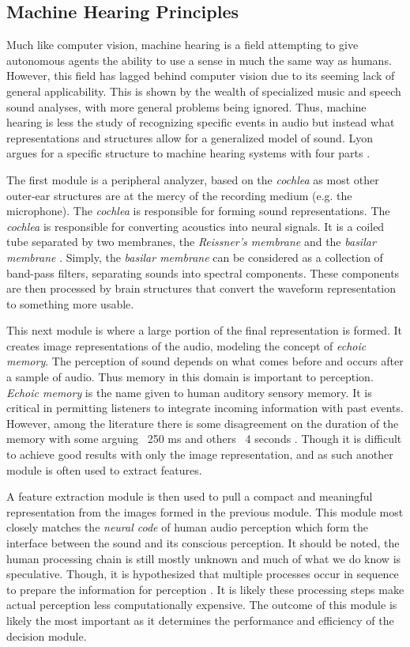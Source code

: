 \subsection{Machine Hearing Principles}

Much like computer vision, machine hearing is a field attempting to give autonomous agents the ability to use a sense in much the same way as humans. However, this field has lagged behind computer vision due to its seeming lack of general applicability. This is shown by the wealth of specialized music and speech sound analyses, with more general problems being ignored. Thus, machine hearing is less the study of recognizing specific events in audio but instead what representations and structures allow for a generalized model of sound. Lyon argues for a specific structure to machine hearing systems with four parts \cite{lyon_machine_2010}.

The first module is a peripheral analyzer, based on the \textit{cochlea} as most other outer-ear structures are at the mercy of the recording medium (e.g. the microphone). The \textit{cochlea} is responsible for forming sound representations. The \textit{cochlea} is responsible for converting acoustics into neural signals. It is a coiled tube separated by two membranes, the \textit{Reissner's membrane} and the \textit{basilar membrane} \cite{Plack2018}. Simply, the \textit{basilar membrane} can be considered as a collection of band-pass filters, separating sounds into spectral components. These components are then processed by brain structures that convert the waveform representation to something more usable.

This next module is where a large portion of the final representation is formed. It creates image representations of the audio, modeling the concept of \textit{echoic memory}. The perception of sound depends on what comes before and occurs after a sample of audio. Thus memory in this domain is important to perception. \textit{Echoic memory} is the name given to human auditory sensory memory. It is critical in permitting listeners to integrate incoming information with past events. However, among the literature there is some disagreement on the duration of the memory with some arguing ~250 ms and others ~4 seconds \cite{Wingfield2016}. Though it is difficult to achieve good results with only the image representation, and as such another module is often used to extract features.

A feature extraction module is then used to pull a compact and meaningful representation from the images formed in the previous module. This module most closely matches the \textit{neural code} of human audio perception which form the interface between the sound and its conscious perception. It should be noted, the human processing chain is still mostly unknown and much of what we do know is speculative. Though, it is hypothesized that multiple processes occur in sequence to prepare the information for perception \cite{Eggermont2001}. It is likely these processing steps make actual perception less computationally expensive. The outcome of this module is likely the most important as it determines the performance and efficiency of the decision module.

